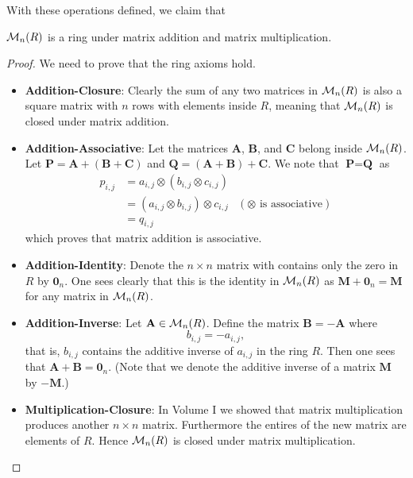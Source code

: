 \newpage

With these operations defined, we claim that
\begin{proposition}
    $\mathcal{M}_{n}(R)$ is a ring under matrix addition and matrix multiplication.
\end{proposition}
\begin{proof}
    We need to prove that the ring axioms hold.
    \begin{itemize}
        \item \textbf{Addition-Closure}: Clearly the sum of any two matrices in $\mathcal{M}_{n}(R)$ is also a square matrix with $n$ rows with elements inside $R$, meaning that $\mathcal{M}_{n}(R)$ is closed under matrix addition.

        \item \textbf{Addition-Associative}: Let the matrices $\textbf{A}$, $\textbf{B}$, and $\textbf{C}$ belong inside $\mathcal{M}_{n}(R)$. Let $\textbf{P} = \textbf{A} + (\textbf{B} + \textbf{C})$ and $\textbf{Q} = (\textbf{A} + \textbf{B}) + \textbf{C}$. We note that $\textbf{P} = \textbf{Q}$ as
        \begin{align*}
            p_{i,j} &= a_{i,j} \otimes (b_{i,j} \otimes c_{i,j})\\
            &= (a_{i,j} \otimes b_{i,j}) \otimes c_{i,j} & (\otimes\text{ is associative})\\
            &= q_{i,j}
        \end{align*}
        which proves that matrix addition is associative.

        \item \textbf{Addition-Identity}: Denote the $n \times n$ matrix with contains only the zero in $R$ by $\textbf{0}_n$. One sees clearly that this is the identity in $\mathcal{M}_{n}(R)$ as $\textbf{M} + \textbf{0}_n = \textbf{M}$ for any matrix in $\mathcal{M}_{n}(R)$.
        
        \item \textbf{Addition-Inverse}: Let $\textbf{A} \in \mathcal{M}_{n}(R)$. Define the matrix $\textbf{B} = -\textbf{A}$ where
        \[
            b_{i,j} = -a_{i,j},    
        \]
        that is, $b_{i,j}$ contains the additive inverse of $a_{i,j}$ in the ring $R$. Then one sees that $\textbf{A} + \textbf{B} = \textbf{0}_n$.\newline
        (Note that we denote the additive inverse of a matrix $\textbf{M}$ by $-\textbf{M}$.)

        \item \textbf{Multiplication-Closure}: In Volume I we showed that matrix multiplication produces another $n \times n$ matrix. Furthermore the entires of the new matrix are elements of $R$. Hence $\mathcal{M}_{n}(R)$ is closed under matrix multiplication.
        

\end{itemize}
\end{proof}
